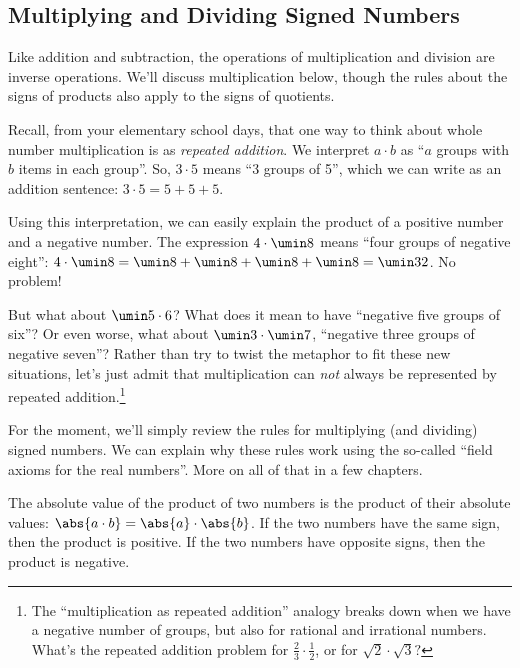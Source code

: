 \subsection{Multiplying and Dividing Signed Numbers}

Like addition and subtraction, the operations of multiplication and division are inverse operations. We'll discuss multiplication below, though the rules about the signs of products also apply to the signs of quotients.

Recall, from your elementary school days, that one way to think about whole number multiplication is as {\em repeated addition}. We interpret $a \cdot b$ as ``$a$ groups with $b$ items in each group''. So, $3 \cdot 5$ means ``3 groups of 5'', which we can write as an addition sentence: $3 \cdot 5 = 5 + 5 + 5$.

Using this interpretation, we can easily explain the product of a positive number and a negative number. The expression $4\cdot\umin8$ means ``four groups of negative eight'': $4 \cdot \umin8 = \umin8 + \umin8 + \umin8 + \umin8 = \umin32$. No problem!

But what about $\umin5 \cdot 6$? What does it mean to have ``negative five groups of six''? Or even worse, what about $\umin3 \cdot \umin7$, ``negative three groups of negative seven''? Rather than try to twist the metaphor to fit these new situations, let's just admit that multiplication can {\em not} always be represented by repeated addition.\footnote{The ``multiplication as repeated addition'' analogy breaks down when we have a negative number of groups, but also for rational and irrational numbers. What's the repeated addition problem for $\frac{2}{3} \cdot \frac{1}{2}$, or for $\sqrt{2} \cdot \sqrt{3}?$}

For the moment, we'll simply review the rules for multiplying (and dividing) signed numbers. We can explain why these rules work using the so-called ``field axioms for the real numbers''. More on all of that in a few chapters.

\begin{boxeddef}
The absolute value of the product of two numbers is the product of their absolute values: $\abs{a \cdot b} = \abs{a} \cdot \abs{b}$. If the two numbers have the same sign, then the product is positive. If the two numbers have opposite signs, then the product is negative.
\end{boxeddef}

